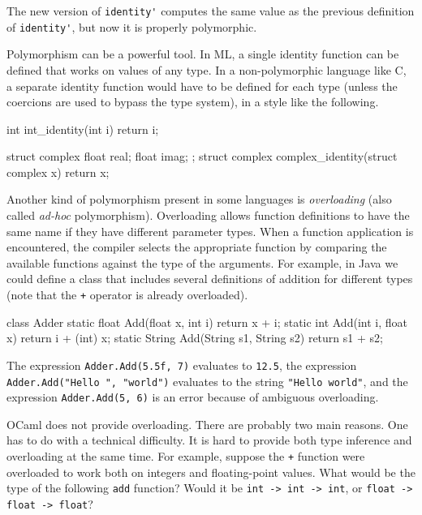 The new version of \hbox{\hbox{\lstinline/identity'/}} computes the same value as the
previous definition of \hbox{\hbox{\lstinline/identity'/}}, but now it is properly
polymorphic.


Polymorphism can be a powerful tool.  In ML, a single identity
function can be defined that works on values of any type.  In a non-polymorphic
language like C, a separate identity function would have to be defined
for each type (unless the coercions are used to bypass the type
system), in a style like the following.

\begin{ccode}
int int_identity(int i) { return i; }

struct complex { float real; float imag; };
struct complex complex_identity(struct complex x) { return x; }
\end{ccode}


Another kind of polymorphism present in some languages is
\emph{overloading} (also called \emph{ad-hoc} polymorphism).
Overloading allows function definitions to have the same name if they
have different parameter types.  When a function application is encountered,
the compiler selects the appropriate function by comparing the
available functions against the type of the arguments.  For example,
in Java we could define a class that includes several definitions of
addition for different types (note that the \hbox{\hbox{\lstinline/+/}} operator is
already overloaded).

\begin{ocaml}
class Adder {
    static float Add(float x, int i) { return x + i; }
    static int Add(int i, float x) { return i + (int) x; }
    static String Add(String s1, String s2) { return s1 + s2; }
}
\end{ocaml}
%
The expression \hbox{\hbox{\lstinline/Adder.Add(5.5f, 7)/}} evaluates to \hbox{\lstinline/12.5/}, the
expression \hbox{\hbox{\lstinline/Adder.Add("Hello ", "world")/}} evaluates to the string
\hbox{\hbox{\lstinline/"Hello world"/}}, and the expression \hbox{\lstinline/Adder.Add(5, 6)/} is an
error because of ambiguous overloading.

OCaml does not provide overloading.  There are probably two
main reasons.  One has to do with a technical difficulty.  It is hard
to provide both type inference and overloading at the same
time.  For example, suppose the \hbox{\hbox{\lstinline/+/}} function were overloaded to
work both on integers and floating-point values.  What would be the
type of the following \hbox{\hbox{\lstinline/add/}} function?  Would it be
\lstinline$int -> int -> int$, or \hbox{\hbox{\lstinline/float -> float -> float/}}?

